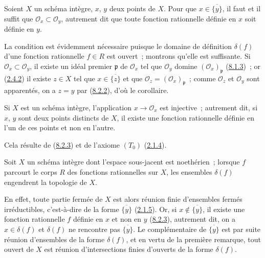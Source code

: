 \begin{corollary}[8.2.3]
\label{I.8.2.3-fr}
Soient $X$ un schéma intègre, $x$, $y$ deux points de $X$. Pour que
$x\in\overline{\{y\}}$, il faut et il suffit que
$\mathscr{O}_x\subset\mathscr{O}_y$, autrement dit que toute fonction
rationnelle définie en $x$ soit définie en $y$.
\end{corollary}

La condition est évidemment nécessaire puisque le domaine de définition
$\delta(f)$ d'une fonction rationnelle $f\in R$ est ouvert~; montrons qu'elle
est suffisante. Si $\mathscr{O}_x\subset\mathscr{O}_y$, il existe un idéal
premier $\mathfrak p$ de $\mathscr{O}_x$ tel que $\mathscr{O}_y$ domine
$(\mathscr{O}_x)_\mathfrak p$ (\hyperref[I.8.1.3-fr]{8.1.3})~; or
(\hyperref[I.2.4.2-fr]{2.4.2}) il existe $z\in X$ tel que
$x\in\overline{\{z\}}$ et que
$\mathscr{O}_z=(\mathscr{O}_x)_\mathfrak p$~; comme $\mathscr{O}_z$ et
$\mathscr{O}_y$ sont apparentés, on a $z=y$ par
(\hyperref[I.8.2.2-fr]{8.2.2}), d'où le corollaire.

\begin{corollary}[8.2.4]
\label{I.8.2.4-fr}
Si $X$ est un schéma intègre, l'application $x\to\mathscr{O}_x$ est
injective~; autrement dit, si $x$, $y$ sont deux points distincts de $X$, il
existe une fonction rationnelle définie en l'un de ces points et non en
l'autre.
\end{corollary}

Cela résulte de (\hyperref[I.8.2.3-fr]{8.2.3}) et de l'axiome
$(T_0)$ (\hyperref[I.2.1.4-fr]{2.1.4}).

\begin{corollary}[8.2.5]
\label{I.8.2.5-fr}
Soit $X$ un schéma intègre dont l'espace sous-jacent est noethérien~;
lorsque $f$ parcourt le corps $R$ des fonctions rationnelles sur $X$, les
ensembles $\delta(f)$ engendrent la topologie de $X$.
\end{corollary}

En effet, toute partie fermée de $X$ est alors réunion finie d'ensembles
fermés irréductibles, c'est-à-dire de la forme $\overline{\{y\}}$
(\hyperref[I.2.1.5-fr]{2.1.5}). Or, si
$x\notin\overline{\{y\}}$, il existe une fonction rationnelle $f$ définie en
$x$ et non en $y$ (\hyperref[I.8.2.3-fr]{8.2.3}), autrement dit, on a
$x\in\delta(f)$ et $\delta(f)$ ne rencontre pas $\overline{\{y\}}$. Le
complémentaire de $\overline{\{y\}}$ est par suite réunion d'ensembles de la
forme $\delta(f)$, et en vertu de la première remarque, tout ouvert de $X$ est
réunion d'intersections finies d'ouverts de la forme $\delta(f)$.

